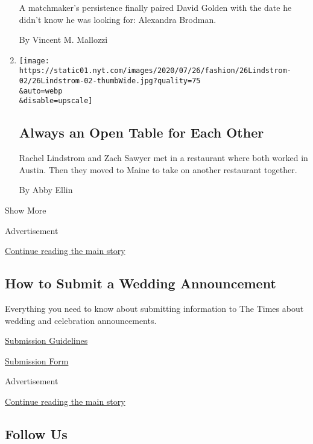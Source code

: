 \begin{enumerate}
  A matchmaker's persistence finally paired David Golden with the date
  he didn't know he was looking for: Alexandra Brodman.

  By Vincent M. Mallozzi
\item
  \href{/2020/07/24/fashion/weddings/always-an-open-table-for-each-other.html}{}

  \texttt{[image: https://static01.nyt.com/images/2020/07/26/fashion/26Lindstrom-02/26Lindstrom-02-thumbWide.jpg?quality=75\\\&auto=webp\\\&disable=upscale]}

  \hypertarget{always-an-open-table-for-each-other}{%
  \subsection{Always an Open Table for Each
  Other}\label{always-an-open-table-for-each-other}}

  Rachel Lindstrom and Zach Sawyer met in a restaurant where both worked
  in Austin. Then they moved to Maine to take on another restaurant
  together.

  By Abby Ellin
\end{enumerate}

Show More

Advertisement

\protect\hyperlink{after-mid5}{Continue reading the main story}

\hypertarget{how-to-submit-a-wedding-announcement}{%
\subsection{How to Submit a Wedding
Announcement}\label{how-to-submit-a-wedding-announcement}}

Everything you need to know about submitting information to The Times
about wedding and celebration announcements.

\href{https://www.nytimes.com/2018/01/09/fashion/weddings/wedding-submission-faqs.html}{Submission
Guidelines}

\href{http://www.nytimes.com/style/weddings/announcements}{Submission
Form}

Advertisement

\protect\hyperlink{after-mktg}{Continue reading the main story}

\hypertarget{follow-us}{%
\subsection{Follow Us}\label{follow-us}}

